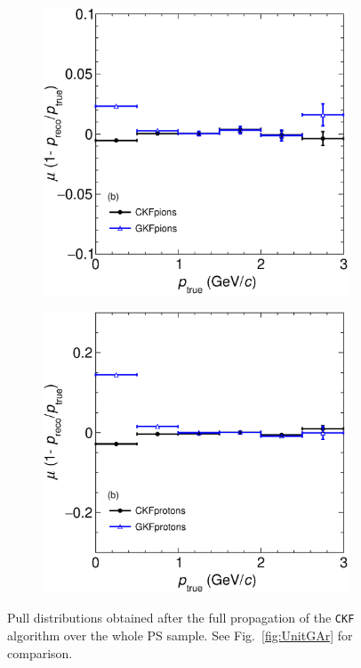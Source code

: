 \begin{figure}[t]
\begin{subfigure}{0.32\textwidth}
         \caption{}
         \label{fig:pBiasVSp13_Int}
     \end{subfigure}
     \begin{subfigure}{0.32\textwidth}
         \centering
         \includegraphics[width=\textwidth]{figures/ch5-KF_NDGAr/FullSample/Int/pRes/2D/BiaspVSp_211.eps}
         \caption{}
         \label{fig:pBiasVSp211_Int}
     \end{subfigure}
          \begin{subfigure}{0.32\textwidth}
         \centering
         \includegraphics[width=\textwidth]{figures/ch5-KF_NDGAr/FullSample/Int/pRes/2D/BiaspVSp_2212.eps}
         \caption{}
         \label{fig:pBiasVSp2212_Int}
     \end{subfigure}
        \caption{Pull distributions obtained after the full propagation of the \texttt{CKF} algorithm over the whole PS sample. See Fig.~\ref{fig:UnitGAr} for comparison.}
        \label{fig:pRes2Dp_Int}
\end{figure}


